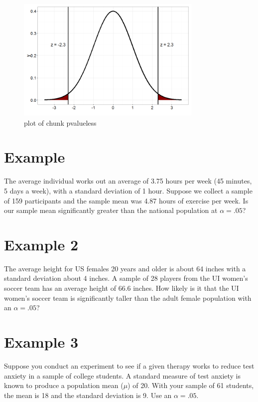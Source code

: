 \documentclass[12pt]{article}
\begin{document}
\begin{figure}[H]
\centering
\includegraphics[width=3.5in]{figure/pvalueless-1.png}
\caption{plot of chunk pvalueless}
\end{figure}

\section{Example}\label{example-3}

The average individual works out an average of 3.75 hours per week (45
minutes, 5 days a week), with a standard deviation of 1 hour. Suppose we
collect a sample of 159 participants and the sample mean was 4.87 hours
of exercise per week. Is our sample mean significantly greater than the
national population at \(\alpha = .05\)?



\section{Example 2}\label{example-2-1}

The average height for US females 20 years and older is about 64 inches
with a standard deviation about 4 inches. A sample of 28 players from
the UI women's soccer team has an average height of 66.6 inches. How
likely is it that the UI women's soccer team is significantly taller
than the adult female population with an \(\alpha = .05\)?



\section{Example 3}\label{example-3-1}

Suppose you conduct an experiment to see if a given therapy works to
reduce test anxiety in a sample of college students. A standard measure
of test anxiety is known to produce a population mean (\(\mu\)) of 20.
With your sample of 61 students, the mean is 18 and the standard
deviation is 9. Use an \(\alpha = .05\).
\end{document}
